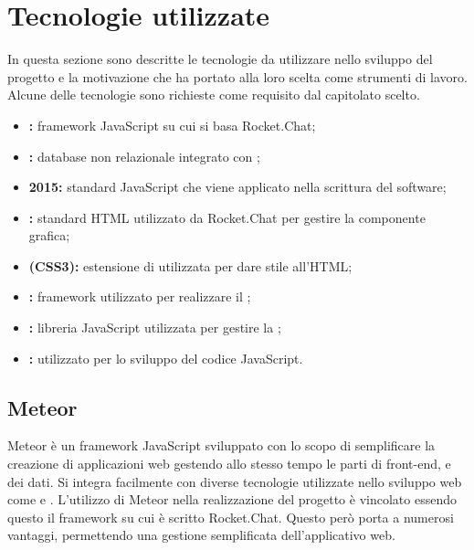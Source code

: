 \section{Tecnologie utilizzate}
In questa sezione sono descritte le tecnologie da utilizzare nello sviluppo del progetto \ProjectName{} e la motivazione che ha portato alla loro scelta come strumenti di lavoro. Alcune delle tecnologie sono richieste come requisito dal capitolato scelto.
\begin{itemize}
	\item \textbf{:} framework JavaScript su cui si basa Rocket.Chat;
	\item \textbf{:} database non relazionale integrato con ;
	\item \textbf{ 2015:} standard JavaScript che viene applicato nella scrittura del software;
	\item \textbf{:} standard HTML utilizzato da Rocket.Chat per gestire la componente grafica;
	\item \textbf{ (CSS3):} estensione di  utilizzata per dare stile all'HTML; 
	\item \textbf{:} framework utilizzato per realizzare il ;
	\item \textbf{:} libreria JavaScript utilizzata per gestire la ;
	\item \textbf{:}  utilizzato per lo sviluppo del codice JavaScript.
\end{itemize}

\subsection{Meteor}
Meteor è un framework JavaScript sviluppato con lo scopo di semplificare la creazione di applicazioni web gestendo allo stesso tempo le parti di front-end,  e dei dati. Si integra facilmente con diverse tecnologie utilizzate nello sviluppo web come  e .
L'utilizzo di Meteor nella realizzazione del progetto è vincolato essendo questo il framework su cui è scritto Rocket.Chat. Questo però porta a numerosi vantaggi, permettendo una gestione semplificata dell'applicativo web.

